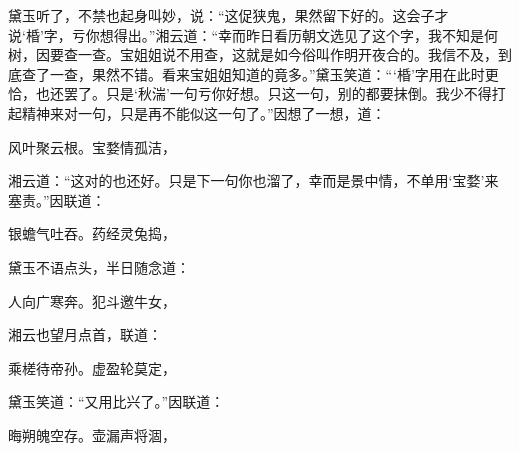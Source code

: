 \begin{parag}
    黛玉听了，不禁也起身叫妙，说：“这促狭鬼，果然留下好的。这会子才说‘棔’字，亏你想得出。”湘云道：“幸而昨日看历朝文选见了这个字，我不知是何树，因要查一查。宝姐姐说不用查，这就是如今俗叫作明开夜合的。我信不及，到底查了一查，果然不错。看来宝姐姐知道的竟多。”黛玉笑道：“‘棔’字用在此时更恰，也还罢了。只是‘秋湍’一句亏你好想。只这一句，别的都要抹倒。我少不得打起精神来对一句，只是再不能似这一句了。”因想了一想，道：
\end{parag}


\begin{poem}
    \begin{pl}
        风叶聚云根。宝婺情孤洁，
    \end{pl}
\end{poem}


\begin{parag}
    湘云道：“这对的也还好。只是下一句你也溜了，幸而是景中情，不单用‘宝婺’来塞责。”因联道：
\end{parag}


\begin{poem}
    \begin{pl}
        银蟾气吐吞。药经灵兔捣，
    \end{pl}
\end{poem}


\begin{parag}
    黛玉不语点头，半日随念道：
\end{parag}


\begin{poem}
    \begin{pl}
        人向广寒奔。犯斗邀牛女，
    \end{pl}
\end{poem}


\begin{parag}
    湘云也望月点首，联道：
\end{parag}


\begin{poem}
    \begin{pl}
        乘槎待帝孙。虚盈轮莫定，
    \end{pl}
\end{poem}


\begin{parag}
    黛玉笑道：“又用比兴了。”因联道：
\end{parag}


\begin{poem}
    \begin{pl}
        晦朔魄空存。壶漏声将涸，
    \end{pl}
\end{poem}


